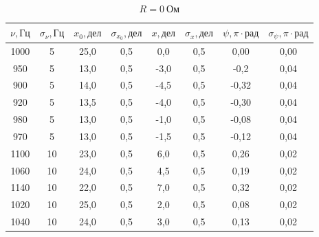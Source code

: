 \documentclass[a4paper, 12pt]{article}
\begin{document}
\begin{table}[h!]
\begin{center}
\begin{tabular}{|c|c|c|c|c|c|c|c|}
\hline
$\nu, Гц$ & $\sigma_{\nu}, Гц$ & $x_0, дел$ & $\sigma_{x_0}, дел$ & $x, дел$ & $\sigma_x, дел$ & $\psi, \pi \cdot рад$ & $\sigma_{\psi}, \pi \cdot рад$ \\ \hline
1000 & 5  & 25,0 & 0,5 & 0,0  & 0,5 & 0,00  & 0,00  \\ \hline 
950  & 5  & 13,0 & 0,5 & -3,0 & 0,5 & -0,2  & 0,04 \\ \hline 
900  & 5  & 14,0 & 0,5 & -4,5 & 0,5 & -0,32 & 0,04 \\ \hline 
920  & 5  & 13,5 & 0,5 & -4,0 & 0,5 & -0,30 & 0,04 \\ \hline 
980  & 5  & 13,0 & 0,5 & -1,0 & 0,5 & -0,08 & 0,04 \\ \hline
970  & 5  & 13,0 & 0,5 & -1,5 & 0,5 & -0,12 & 0,04 \\ \hline
1100 & 10 & 23,0 & 0,5 & 6,0  & 0,5 & 0,26  & 0,02  \\ \hline
1060 & 10 & 24,0 & 0,5 & 4,5  & 0,5 & 0,19  & 0,02  \\ \hline
1140 & 10 & 22,0 & 0,5 & 7,0  & 0,5 & 0,32  & 0,02  \\ \hline
1020 & 10 & 25,0 & 0,5 & 2,0  & 0,5 & 0,08  & 0,02  \\ \hline
1040 & 10 & 24,0 & 0,5 & 3,0  & 0,5 & 0,13  & 0,02  \\ \hline
\end{tabular}
\end{center}
\caption{$R = 0~Ом$}
\label{tab3}
\end{table}
\end{document}
